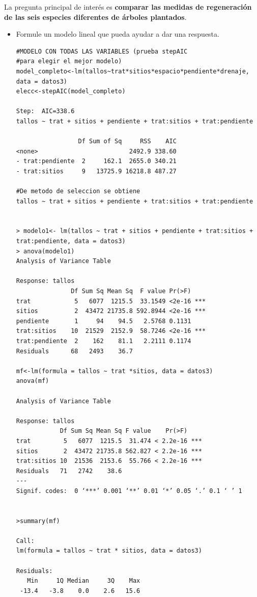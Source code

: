 \documentclass[12pt,a4paper]{report}
\begin{document}
\begin{enumerate}
La pregunta principal de interés es \textbf{comparar las medidas de regeneración de las seis especies diferentes de
árboles plantados}.\\
\begin{itemize}
\item[a)]Formule un modelo lineal que pueda ayudar a dar una respuesta.\\
\begin{verbatim}
#MODELO CON TODAS LAS VARIABLES (prueba stepAIC 
#para elegir el mejor modelo)
model_completo<-lm(tallos~trat*sitios*espacio*pendiente*drenaje, 
data = datos3)
elecc<-stepAIC(model_completo)

Step:  AIC=338.6
tallos ~ trat + sitios + pendiente + trat:sitios + trat:pendiente

                 Df Sum of Sq     RSS    AIC
<none>                         2492.9 338.60
- trat:pendiente  2     162.1  2655.0 340.21
- trat:sitios     9   13725.9 16218.8 487.27

#De metodo de seleccion se obtiene
tallos ~ trat + sitios + pendiente + trat:sitios + trat:pendiente


> modelo1<- lm(tallos ~ trat + sitios + pendiente + trat:sitios + 
trat:pendiente, data = datos3)
> anova(modelo1)
Analysis of Variance Table

Response: tallos
               Df Sum Sq Mean Sq  F value Pr(>F)    
trat            5   6077  1215.5  33.1549 <2e-16 ***
sitios          2  43472 21735.8 592.8944 <2e-16 ***
pendiente       1     94    94.5   2.5768 0.1131    
trat:sitios    10  21529  2152.9  58.7246 <2e-16 ***
trat:pendiente  2    162    81.1   2.2111 0.1174    
Residuals      68   2493    36.7              

mf<-lm(formula = tallos ~ trat *sitios, data = datos3)
anova(mf)

Analysis of Variance Table

Response: tallos
            Df Sum Sq Mean Sq F value    Pr(>F)    
trat         5   6077  1215.5  31.474 < 2.2e-16 ***
sitios       2  43472 21735.8 562.827 < 2.2e-16 ***
trat:sitios 10  21536  2153.6  55.766 < 2.2e-16 ***
Residuals   71   2742    38.6                      
---
Signif. codes:  0 ‘***’ 0.001 ‘**’ 0.01 ‘*’ 0.05 ‘.’ 0.1 ‘ ’ 1


>summary(mf)

Call:
lm(formula = tallos ~ trat * sitios, data = datos3)

Residuals:
   Min     1Q Median     3Q    Max 
 -13.4   -3.8    0.0    2.6   15.6 


\end{verbatim}
\end{itemize}
\end{enumerate}
\end{document}
